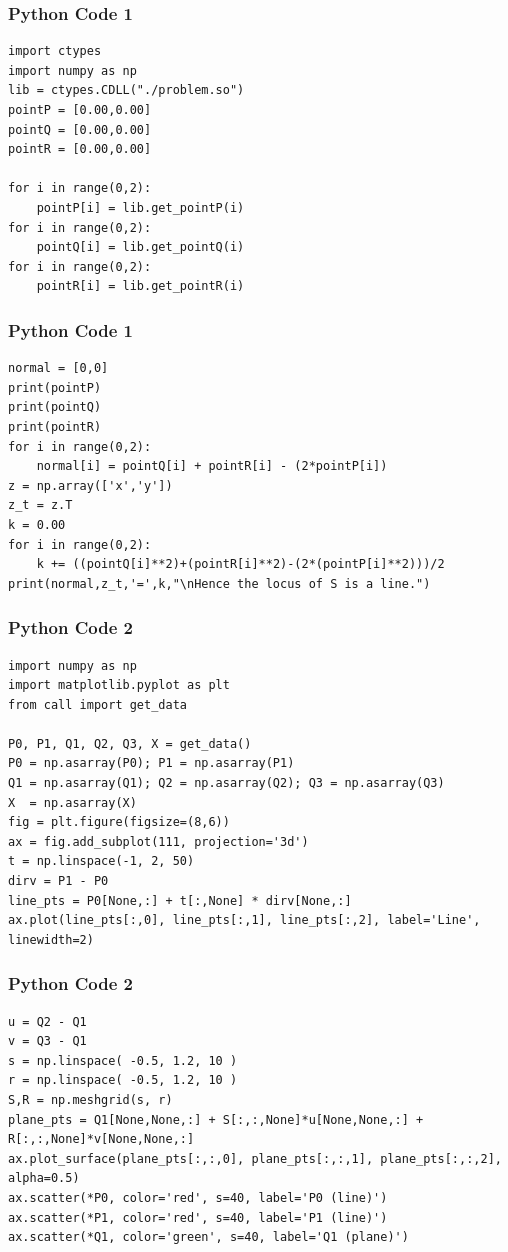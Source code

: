 \documentclass{beamer}
\begin{document}
\begin{frame}[fragile]
    \frametitle{Python Code 1}
    \begin{lstlisting}
import ctypes
import numpy as np
lib = ctypes.CDLL("./problem.so")
pointP = [0.00,0.00]
pointQ = [0.00,0.00]
pointR = [0.00,0.00]

for i in range(0,2):
    pointP[i] = lib.get_pointP(i)
for i in range(0,2):
    pointQ[i] = lib.get_pointQ(i)
for i in range(0,2):
    pointR[i] = lib.get_pointR(i)
    \end{lstlisting}
\end{frame}

\begin{frame}[fragile]
    \frametitle{Python Code 1}
    \begin{lstlisting}
normal = [0,0]
print(pointP)
print(pointQ)
print(pointR)
for i in range(0,2):
    normal[i] = pointQ[i] + pointR[i] - (2*pointP[i])
z = np.array(['x','y'])
z_t = z.T
k = 0.00
for i in range(0,2):
    k += ((pointQ[i]**2)+(pointR[i]**2)-(2*(pointP[i]**2)))/2
print(normal,z_t,'=',k,"\nHence the locus of S is a line.")
    \end{lstlisting}
\end{frame}

\begin{frame}[fragile]
    \frametitle{Python Code 2}
    \begin{lstlisting}
import numpy as np
import matplotlib.pyplot as plt
from call import get_data

P0, P1, Q1, Q2, Q3, X = get_data()
P0 = np.asarray(P0); P1 = np.asarray(P1)
Q1 = np.asarray(Q1); Q2 = np.asarray(Q2); Q3 = np.asarray(Q3)
X  = np.asarray(X)
fig = plt.figure(figsize=(8,6))
ax = fig.add_subplot(111, projection='3d')
t = np.linspace(-1, 2, 50)
dirv = P1 - P0
line_pts = P0[None,:] + t[:,None] * dirv[None,:]
ax.plot(line_pts[:,0], line_pts[:,1], line_pts[:,2], label='Line', linewidth=2)
    \end{lstlisting}
\end{frame}

\begin{frame}[fragile]
    \frametitle{Python Code 2}
    \begin{lstlisting}
u = Q2 - Q1
v = Q3 - Q1
s = np.linspace( -0.5, 1.2, 10 )
r = np.linspace( -0.5, 1.2, 10 )
S,R = np.meshgrid(s, r)
plane_pts = Q1[None,None,:] + S[:,:,None]*u[None,None,:] + R[:,:,None]*v[None,None,:]
ax.plot_surface(plane_pts[:,:,0], plane_pts[:,:,1], plane_pts[:,:,2], alpha=0.5)
ax.scatter(*P0, color='red', s=40, label='P0 (line)')
ax.scatter(*P1, color='red', s=40, label='P1 (line)')
ax.scatter(*Q1, color='green', s=40, label='Q1 (plane)')    \end{lstlisting}
\end{frame}
\end{document}
